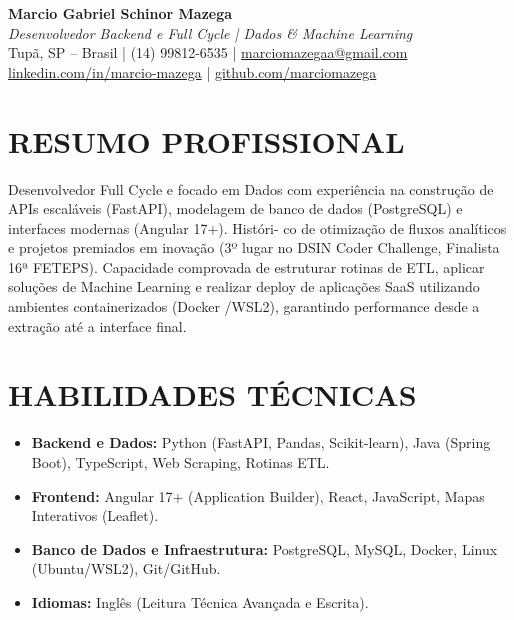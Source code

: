 \documentclass[11pt,a4paper]{article}
\begin{document}
\pagestyle{empty}

{\centering
\textbf{\huge Marcio Gabriel Schinor Mazega} \\ \vspace{0.2cm}
\textit{\large Desenvolvedor Backend e Full Cycle | Dados \& Machine Learning} \\ \vspace{0.1cm}
Tupã, SP -- Brasil | (14) 99812-6535 | \href{mailto:marciomazegaa@gmail.com}{marciomazegaa@gmail.com} \\
\href{https://linkedin.com/in/marcio-mazega}{linkedin.com/in/marcio-mazega} | \href{https://github.com/marciomazega}{github.com/marciomazega} \\
}

\vspace{0.4cm}
\section*{RESUMO PROFISSIONAL}
Desenvolvedor Full Cycle e focado em Dados com experiência na construção de APIs escaláveis (FastAPI), modelagem de banco de dados (PostgreSQL) e interfaces modernas (Angular 17+). Históri-
co de otimização de fluxos analíticos e projetos premiados em inovação (3º lugar no DSIN Coder Challenge, Finalista 16ª FETEPS). Capacidade comprovada de estruturar rotinas de ETL, aplicar soluções de Machine Learning e realizar deploy de aplicações SaaS utilizando ambientes containerizados (Docker
/WSL2), garantindo performance desde a extração até a interface final.

\vspace{0.2cm}
\section*{HABILIDADES TÉCNICAS}
\begin{itemize}
    \item \textbf{Backend e Dados:} Python (FastAPI, Pandas, Scikit-learn), Java (Spring Boot), TypeScript, Web Scraping, Rotinas ETL.
    \item \textbf{Frontend:} Angular 17+ (Application Builder), React, JavaScript, Mapas Interativos (Leaflet).
    \item \textbf{Banco de Dados e Infraestrutura:} PostgreSQL, MySQL, Docker, Linux (Ubuntu/WSL2), Git/GitHub.
    \item \textbf{Idiomas:} Inglês (Leitura Técnica Avançada e Escrita).
\end{itemize}
\end{document}
